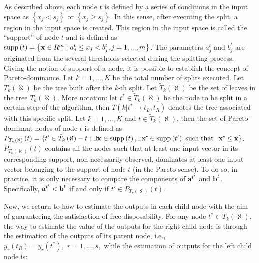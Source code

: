 As described above, each node \(t\) is defined by a series of conditions
in the input space as \(\left\{x_{j} <s_{j} \right\}\) or
\(\left\{x_{j} \ge s_{j} \right\}\). In this sense, after executing the
split, a region in the input space is created. This region in the input
space is called the ``support'' of node \(t\) and is defined as
\({\rm supp}\left(t\right)=\left\{{\it \textbf{x}}\in R_{+}^{m} :a_{j}^{t} \le x_{j} <b_{j}^{t} ,j=1,...,m\right\}\).
The parameters \(a_{j}^{t}\) and \(b_{j}^{t}\) are originated from the
several thresholds selected during the splitting process. Giving the
notion of support of a node, it is possible to establish the concept of
Pareto-dominance. Let \(k=1,...,K\) be the total number of splits
executed. Let \(T_{k} \left(\aleph \right)\) be the tree built after the
\textit{k-}th split. Let \(\tilde{T}_{k} \left(\aleph \right)\) be the
set of leaves in the tree \(T_{k} \left(\aleph \right)\). More notation:
let \(t^{*} \in \tilde{T}_{k} \left(\aleph \right)\) be the node to be
split in a certain step of the algorithm, then
\(T\left(k|t^{*} \to t_{L} ,t_{R} \right)\) denotes the tree associated
with this specific split. Let \(k=1,...,K\) and
\(t\in \tilde{T}_{k} \left(\aleph \right)\), then the set of
Pareto-dominant nodes of node \(t\) is defined as
\(P_{T_{k} \left(\aleph \right)} \left(t\right)=\{t'\in \tilde{T}_{k} \left(\aleph \right)-t:\exists {\it \textbf{x}}\in {\rm supp}\left(t\right),\exists {\it \textbf{x'}}\in {\rm supp}\left(t'\right)\, \, {\rm such\; that}\,\)
\({\it \textbf{x'}} \le {\it \textbf{x}}\}\).
\(P_{T_{k} \left(\aleph \right)} \left(t\right)\) contains all the nodes
such that at least one input vector in its corresponding support,
non-necessarily observed, dominates at least one input vector belonging
to the support of node \(t\) (in the Pareto sense). To do so, in
practice, it is only necessary to compare the components of
\({\it \textbf{a}}^{t'}\) and \({\it \textbf{b}}^{t}\). Specifically,
\({\it \textbf{a}}^{t'} <{\it \textbf{b}}^{t}\) if and only if
\(t'\in P_{T_{k} \left(\aleph \right)} \left(t\right)\).

Now, we return to how to estimate the outputs in each child node with
the aim of guaranteeing the satisfaction of free disposability. For any
node \(t^{*} \in \tilde{T}_{k} \left(\aleph \right)\), the way to
estimate the value of the outputs for the right child node is through
the estimation of the outputs of its parent node, i.e.,
\(y_{r} \left(t_{R} \right)=y_{r} (t^{*} ),\, \, r=1,...,s,\) while the
estimation of outputs for the left child node is:

